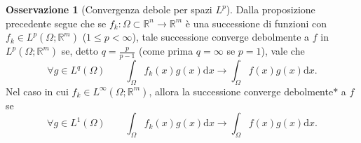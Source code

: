\documentclass[a4paper,11pt]{book}
\theoremstyle{plain}
\newtheorem{prop}[teo]{Proposizione}
\theoremstyle{definition}
\newtheorem{defn}{Definizione}[chapter]
\newtheorem{oss}[defn]{Osservazione}
\theoremstyle{remark}
\newcommand{\R}{\mathbb{R}}
\newcommand{\norm}[1]{\lVert#1\rVert}
\newcommand{\weakconv}{\rightharpoonup}
\newcommand{\dx}{\text{d}x}
\newcommand{\dy}{\text{d}y}
\begin{document}
\begin{oss}[Convergenza debole per spazi $L^{p}$]
	Dalla proposizione precedente segue che se $f_k:\Omega\subset\R^n\to\R^{m}$ è una successione di funzioni con $f_k\in L^p(\Omega;\R^{m})$ ($1\leq p<\infty$), tale successione converge debolmente a $f$ in $L^p(\Omega;\R^{m})$ se, detto $q=\frac{p}{p-1}$ (come prima $q=\infty$ se $p=1$), vale che
	\[
		\forall g\in L^q(\Omega)\qquad \int_{\Omega} f_k(x)g(x)\dx \to \int_{\Omega}f(x)g(x)\dx.
	\]
	Nel caso in cui $f_k\in L^{\infty}(\Omega;\R^{m})$, allora la successione converge debolmente$*$ a $f$ se
	\[
		\forall g\in L^1(\Omega)\qquad \int_{\Omega} f_k(x)g(x)\dx \to \int_{\Omega}f(x)g(x)\dx.
	\]
\end{oss}
\begin{comment}
\begin{prop}\label{prop:2}
	Sia $(u_h)$ una successione in $W^{1,p}(\Omega)$ convergente in $L^p(\Omega)$ a qualche funzione $u$, allora vale che se $1\leq p\leq \infty$ e per ogni $i\in\{1,\ldots,n\}$ esiste una $g_i\in L^p(\Omega)$ tale che $\partial_iu_h\weakconv g_i$ in $L^p(\Omega)$ (se $p=\infty$ allora la convergenza è debole$*$) allora $u\in W^{1,p}(\Omega)$ e $g_i=\partial_iu$.
\end{prop}


\begin{defn}[Prodotto di convoluzione]
	Date $f,g:\R^n\to \R$ definiamo il loro \textit{prodotto di convoluzione} come
	\[
		f*g(x) = \int_{\R^n}f(y)g(x-y)\dy
	\]
	quando questa funzione è ben definita.
\end{defn}
Alcune proprietà del prodotto di convoluzione sono la \textit{commutatività} e l'\textit{associatività}, inoltre vale che, se $f\in L^p(\R^n)$ e $g\in L^q(\R^n)$ con $1/p+1/q=1+1/r$ e $1\leq p,q,r\leq \infty$, allora $f*g$ è definita e
\[
	f*g\in L^r(\R^n)\quad\text{con}\quad\norm{f*g}_r\leq \norm{f}_p\norm{g}_q.
\]
La convoluzione mantiene anche alcune proprietà di regolarità di una delle due funzioni: se $f\in L^1_{loc}(\R^n)$ e $g\in C_c(\R^n)$ allora $f*g$ è definita e continua, se inoltre $g\in C^{\infty}_c(\R^n)$ allora $f*g\in C^{\infty}(\R^n)$ e vale che
\[
	\partial_{\alpha}(f*g)(x)=\int_{\R^n}f(y)\partial_{\alpha}g(x-y)\dy = (f*\partial_{\alpha}g)(x).
\]
Una applicazione del prodotto di convoluzione è la possibilità di trovare una successione di funzioni lisce che approssimi una data funzione $f$: detta $\rho\in C^{\infty}_c(\R^n)$ una funzione liscia con supporto contenuto in $B(0,1)$ tale che $\rho(x)\geq 0$, $\rho(x)=\rho(-x)$ per ogni $x\in \R^n$ e $\int_{\R^n} \rho(x)\dx = 1$, per $\epsilon > 0$ definiamo $\rho_{\epsilon}(x) \coloneqq \epsilon^{-n}\rho(x/\epsilon)$, tali $\rho_{\epsilon}$ vengono detti \textit{mollificatori}. Se $f\in L^p_{loc}(\R^n)$ allora per la successione $f_{\epsilon}=f*\rho_{\epsilon}\in C^{\infty}(\R^n)$ vale che
\[
	\lim_{\epsilon\to 0^+}\norm{f_{\epsilon}-f}_{L^p(A)}=0\qquad\forall A\subset \R^n\text{ compatto},
\]
inoltre se $f$ è continua allora $f_{\epsilon}\to f$ uniformemente su ogni compatto.
\end{comment}
\end{document}
